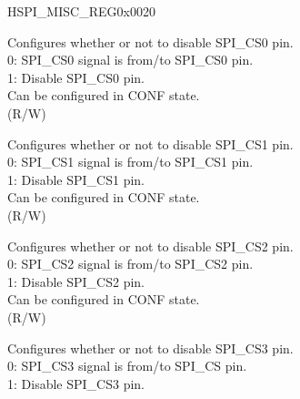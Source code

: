 \begin{register}{H}{SPI\_MISC\_REG}{0x0020}\label{regdesc:SPIMISCREG}
%
%
%
%
%
%
%
%
%
%
%
%
%
%
%
%
%
%
%
%
\regnewline%
\begin{regdesc}\begin{reglist}
\label{fielddesc:SPICS0DIS}\item [SPI\_CS0\_DIS] Configures whether or not to disable SPI\_CS0 pin.\\
0: SPI\_CS0 signal is from/to SPI\_CS0 pin.\\
1: Disable SPI\_CS0 pin.\\
Can be configured in CONF state. \\ (R/W)
\label{fielddesc:SPICS1DIS}\item [SPI\_CS1\_DIS] Configures whether or not to disable SPI\_CS1 pin.\\
0: SPI\_CS1 signal is from/to SPI\_CS1 pin.\\
1: Disable SPI\_CS1 pin.\\
Can be configured in CONF state. \\ (R/W)
\label{fielddesc:SPICS2DIS}\item [SPI\_CS2\_DIS] Configures whether or not to disable SPI\_CS2 pin.\\
0: SPI\_CS2 signal is from/to SPI\_CS2 pin.\\
1: Disable SPI\_CS2 pin.\\
Can be configured in CONF state. \\ (R/W)
\label{fielddesc:SPICS3DIS}\item [SPI\_CS3\_DIS] Configures whether or not to disable SPI\_CS3 pin.\\
0: SPI\_CS3 signal is from/to SPI\_CS pin.\\
1: Disable SPI\_CS3 pin.\\

\end{reglist}
\end{regdesc}
\end{register}
